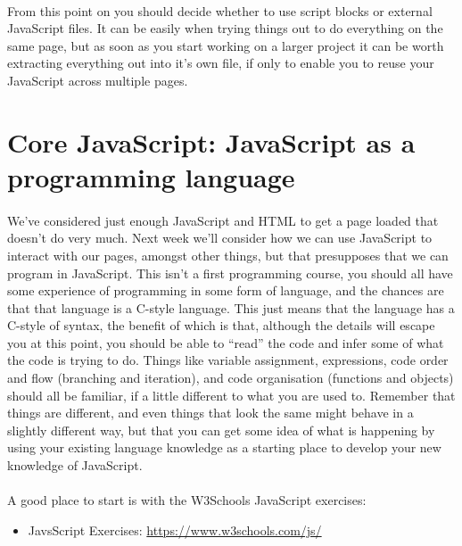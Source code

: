 \documentclass[10pt, a4paper]{article}
\begin{document}
\paragraph{} From this point on you should decide whether to use script blocks or external JavaScript files. It can be easily when trying things out to do everything on the same page, but as soon as you start working on a larger project it can be worth extracting everything out into it's own file, if only to enable you to reuse your JavaScript across multiple pages.

\section{Core JavaScript: JavaScript as a programming language}
\paragraph{} We've considered just enough JavaScript and HTML to get a page loaded that doesn't do very much. Next week we'll consider how we can use JavaScript to interact with our pages, amongst other things, but that presupposes that we can program in JavaScript. This isn't a first programming course, you should all have some experience of programming in some form of language, and the chances are that that language is a C-style language. This just means that the language has a C-style of syntax, the benefit of which is that, although the details will escape you at this point, you should be able to ``read'' the code and infer some of what the code is trying to do. Things like variable assignment, expressions, code order and flow (branching and iteration), and code organisation (functions and objects) should all be familiar, if a little different to what you are used to. Remember that things are different, and even things that look the same might behave in a slightly different way, but that you can get some idea of what is happening by using your existing language knowledge as a starting place to develop your new knowledge of JavaScript.

\paragraph{} A good place to start is with the W3Schools JavaScript exercises:
\begin{itemize}
\item JavsScript Exercises: \url{https://www.w3schools.com/js/}
\end{itemize}
\end{document}
